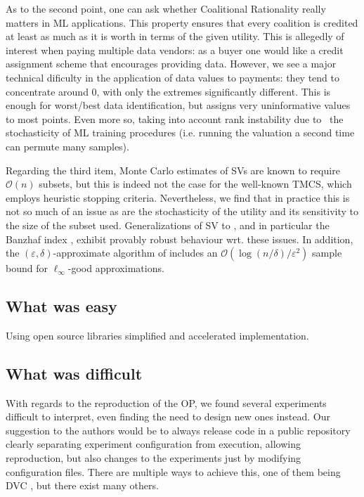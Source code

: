 As to the second point, one can ask whether Coalitional Rationality really
matters in ML applications. This property ensures that every coalition is
credited at least as much as it is worth in terms of the given utility. This
is allegedly of interest when paying multiple data vendors: as a buyer one
would like a credit assignment scheme that encourages providing data. However,
we see a major technical dificulty in the application of data values to
payments: they tend to concentrate around 0, with only the extremes
significantly different. This is enough for worst/best data identification,
but assigns very uninformative values to most points. Even more so, taking
into account rank instability due to \ the stochasticity of ML training
procedures (i.e. running the valuation a second time can permute many
samples).

Regarding the third item, Monte Carlo estimates of SVs are known to require
$\mathcal{O} (n)$ subsets, but this is indeed not the case for the well-known
TMCS, which employs heuristic stopping criteria. Nevertheless, we find that in
practice this is not so much of an issue as are the stochasticity of the
utility and its sensitivity to the size of the subset used. Generalizations of
SV to {}, and in particular the Banzhaf index
{\cite{wang_data_2022}}, exhibit provably robust behaviour wrt. these issues.
In addition, the $(\varepsilon, \delta)$-approximate algorithm of
{\cite{wang_data_2022}} includes an $\mathcal{O} (\log (n / \delta) /
\varepsilon^2)$ sample bound for $\ell_{\infty}$-good approximations.

\subsection{What was easy}

Using open source libraries simplified and accelerated implementation.

\subsection{What was difficult}

With regards to the reproduction of the OP, we found several experiments
difficult to interpret, even finding the need to design new ones instead.
Our suggestion to the authors would be to always release code in a public
repository clearly separating experiment configuration from execution,
allowing reproduction, but also changes to the experiments just by modifying
configuration files. There are multiple ways to achieve this, one of them being
DVC \cite{kuprieiev_dvc_2023}, but there exist many others.

